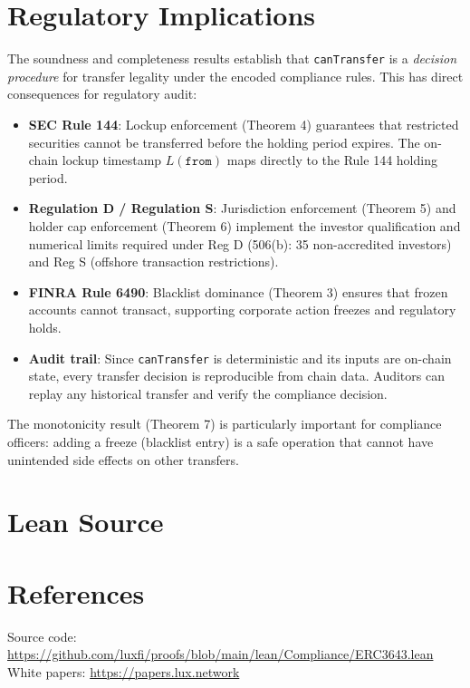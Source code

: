\documentclass[11pt]{article}
\begin{document}
\section{Regulatory Implications}

The soundness and completeness results establish that \texttt{canTransfer} is a \emph{decision procedure} for transfer legality under the encoded compliance rules. This has direct consequences for regulatory audit:

\begin{itemize}
  \item \textbf{SEC Rule 144}: Lockup enforcement (Theorem 4) guarantees that restricted securities cannot be transferred before the holding period expires. The on-chain lockup timestamp $L(\texttt{from})$ maps directly to the Rule 144 holding period.
  \item \textbf{Regulation D / Regulation S}: Jurisdiction enforcement (Theorem 5) and holder cap enforcement (Theorem 6) implement the investor qualification and numerical limits required under Reg D (506(b): 35 non-accredited investors) and Reg S (offshore transaction restrictions).
  \item \textbf{FINRA Rule 6490}: Blacklist dominance (Theorem 3) ensures that frozen accounts cannot transact, supporting corporate action freezes and regulatory holds.
  \item \textbf{Audit trail}: Since \texttt{canTransfer} is deterministic and its inputs are on-chain state, every transfer decision is reproducible from chain data. Auditors can replay any historical transfer and verify the compliance decision.
\end{itemize}

The monotonicity result (Theorem 7) is particularly important for compliance officers: adding a freeze (blacklist entry) is a safe operation that cannot have unintended side effects on other transfers.


\section{Lean Source}


\section{References}
\noindent Source code: \url{https://github.com/luxfi/proofs/blob/main/lean/Compliance/ERC3643.lean}\\
\noindent White papers: \url{https://papers.lux.network}
\end{document}
